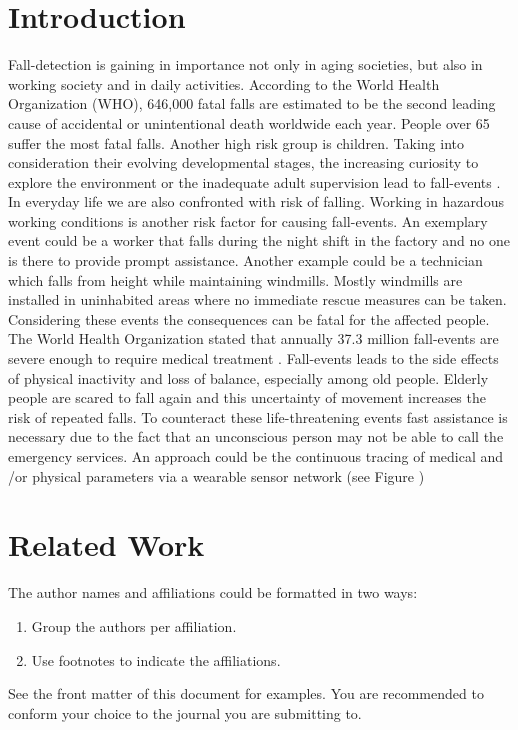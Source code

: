\documentclass[review]{elsarticle}
\begin{document}

\section{Introduction}
Fall-detection is gaining in importance not only in aging societies, but also in working society and in daily activities. According to the World Health Organization (WHO), 646,000 fatal falls are estimated to be the second leading cause of accidental or unintentional death worldwide each year. People over 65 suffer the most fatal falls. Another high risk group is children. Taking into consideration their evolving developmental stages, the increasing curiosity to explore the environment or the inadequate adult supervision lead to fall-events \cite{WHO2018}.
In everyday life we are also confronted with risk of falling. Working in hazardous working conditions is another risk factor for causing fall-events. An exemplary event could be a worker that falls during the night shift in the factory and no one is there to provide prompt assistance. Another example could be a technician which falls from height while maintaining windmills. Mostly windmills are installed in uninhabited areas where no immediate rescue measures can be taken. Considering these events the consequences can be fatal for the affected people. 
The World Health Organization stated that annually 37.3 million fall-events are severe enough to require medical treatment \cite{WHO2018}. Fall-events leads to the side effects of physical inactivity and loss of balance, especially among old people. Elderly people are scared to fall again and this uncertainty of movement increases the risk of repeated falls. 
To counteract these life-threatening events fast assistance is necessary due to the fact that an unconscious person may not be able to call the emergency services. An approach could be the continuous tracing of medical and /or physical parameters via a wearable sensor network (see Figure )



\section{Related Work}

The author names and affiliations could be formatted in two ways:
\begin{enumerate}[(1)]
\item Group the authors per affiliation.
\item Use footnotes to indicate the affiliations.
\end{enumerate}
See the front matter of this document for examples. You are recommended to conform your choice to the journal you are submitting to.
\end{document}
